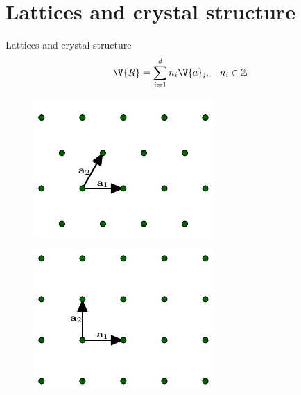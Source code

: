 \documentclass{beamer}
\begin{document}
\section{Lattices and crystal structure}
\begin{frame}{Lattices and crystal structure}
\begin{equation*}
	\V{R} = \sum_{i = 1}^{d} n_i \V{a}_i, \quad n_i \in \mathbb{Z}
\end{equation*}
\begin{figure}[H]
	\centering
	\begin{minipage}{.4\textwidth}
		\centering
		\includegraphics[width=\linewidth]{figures/triangular.pdf}
		\label{fig:triangular_lattice}
	\end{minipage}%
	\hfill
	\begin{minipage}{.4\textwidth}
		\centering
		\includegraphics[width=\linewidth]{figures/square.pdf}
		\label{fig:square_lattice}
	\end{minipage}
\end{figure}
\end{frame}
\end{document}
